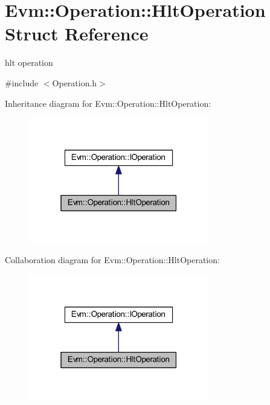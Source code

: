 \hypertarget{struct_evm_1_1_operation_1_1_hlt_operation}{}\section{Evm\+:\+:Operation\+:\+:Hlt\+Operation Struct Reference}
\label{struct_evm_1_1_operation_1_1_hlt_operation}


hlt operation  




{\ttfamily \#include $<$Operation.\+h$>$}



Inheritance diagram for Evm\+:\+:Operation\+:\+:Hlt\+Operation\+:
\nopagebreak
\begin{figure}[H]
\begin{center}
\leavevmode
\includegraphics[width=223pt]{struct_evm_1_1_operation_1_1_hlt_operation__inherit__graph}
\end{center}
\end{figure}


Collaboration diagram for Evm\+:\+:Operation\+:\+:Hlt\+Operation\+:
\nopagebreak
\begin{figure}[H]
\begin{center}
\leavevmode
\includegraphics[width=223pt]{struct_evm_1_1_operation_1_1_hlt_operation__coll__graph}
\end{center}
\end{figure}
